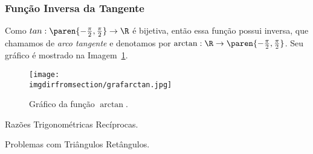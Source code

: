 \subsubsection{Função Inversa da Tangente}

\begin{example}
Como $tan: \paren{- \frac {\pi} 2, \frac {\pi} 2} \to \R$ é
bijetiva, então essa função possui inversa, que chamamos de
\emph{arco tangente} e denotamos por $\arctan : \R \to
\paren{- \frac {\pi} 2, \frac {\pi} 2}$. Seu gráfico é mostrado na Imagem~\ref{img:grafico-arctan}.
%
\begin{figure}[H]
\centering
\texttt{[image: \\imgdirfromsection/grafarctan.jpg]}
\caption{Gráfico da função $\arctan$.}
\label{img:grafico-arctan}
\end{figure}
\end{example}

\begin{onlineact}
    {Razões Trigonométricas Recíprocas}.
\end{onlineact}

\begin{onlineact}
    {Problemas com Triângulos Retângulos}.
\end{onlineact}